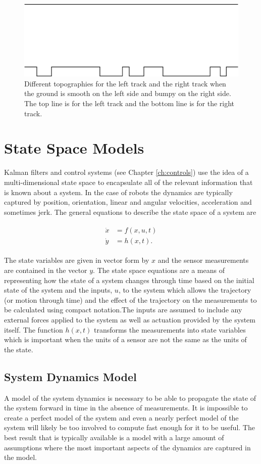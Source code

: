 \begin{figure}[ht!]
	\centering
	\includegraphics[width=.5\textwidth]{images/topography}
	\caption{Different topographies for the left track and the right track when the ground is smooth on the left side and bumpy on the right side. The top line is for the left track and the bottom line is for the right track.}
	\label{fig:topography}
\end{figure}

\section{State Space Models}
\label{sec:statespacemodels}
Kalman filters and control systems (see Chapter \ref{ch:controls}) use the idea of a multi-dimensional state space to encapsulate all of the relevant information that is known about a system. In the case of robots the dynamics are typically captured by position, orientation, linear and angular velocities, acceleration and sometimes jerk. The general equations to describe the state space of a system are

\begin{align}
\label{eq:statespace}
\begin{split}
\dot{x} &= f(x,u,t) \\
\dot{y} &= h(x,t).
\end{split}
\end{align}

The state variables are given in vector form by $x$ and the sensor measurements are contained in the vector $y$. The state space equations are a means of representing how the state of a system changes through time based on the initial state of the system and the inputs, $u$, to the system which allows the trajectory (or motion through time) and the effect of the trajectory on the measurements to be calculated using compact notation.The inputs are assumed to include any external forces applied to the system as well as actuation provided by the system itself. The function $h(x,t)$ transforms the measurements into state variables which is important when the units of a sensor are not the same as the units of the state.

\subsection{System Dynamics Model}
\label{sec:dynamics}
A model of the system dynamics is necessary to be able to propagate the state of the system forward in time in the absence of measurements. It is impossible to create a perfect model of the system and even a nearly perfect model of the system will likely be too involved to compute fast enough for it to be useful. The best result that is typically available is a model with a large amount of assumptions where the most important aspects of the dynamics are captured in the model.


